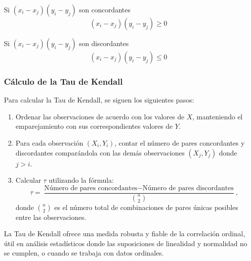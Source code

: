 \documentclass{article}
\begin{document}
Si $(x_i - x_j)(y_i - y_j)$ son concordantes
\[(x_i - x_j)(y_i - y_j) \geq 0\]

Si $(x_i - x_j)(y_i - y_j)$ son discordantes
\[(x_i - x_j)(y_i - y_j) \leq 0\]

\subsubsection*{Cálculo de la Tau de Kendall}

Para calcular la Tau de Kendall, se siguen los siguientes pasos:

\begin{enumerate}
    \item Ordenar las observaciones de acuerdo con los valores de \(X\), manteniendo el emparejamiento con sus correspondientes valores de \(Y\).
    \item Para cada observación \((X_i, Y_i)\), contar el número de pares concordantes y discordantes comparándola con las demás observaciones \((X_j, Y_j)\) donde \(j > i\).
    \item Calcular \(\tau\) utilizando la fórmula:
          \[
              \tau = \frac{\text{Número de pares concordantes} - \text{Número de pares discordantes}}{\binom{n}{2}},
          \]
          donde \(\binom{n}{2}\) es el número total de combinaciones de pares únicas posibles entre las observaciones.
\end{enumerate}

La Tau de Kendall ofrece una medida robusta y fiable de la correlación ordinal, útil en análisis estadísticos donde las suposiciones de linealidad y normalidad no se cumplen, o cuando se trabaja con datos ordinales.
\end{document}
